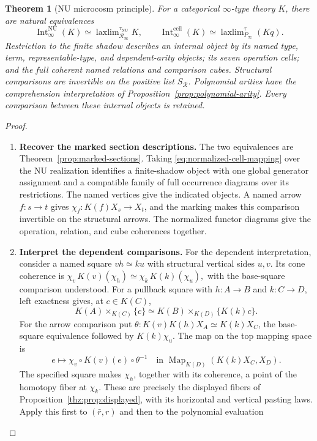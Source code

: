 \documentclass[oneside]{article}
\theoremstyle{plain}
\newtheorem{theorem}{Theorem}[section]
\theoremstyle{definition}
\theoremstyle{remark}
\newcommand{\Int}{\operatorname{Int}}
\newcommand{\Map}{\operatorname{Map}}
\newcommand{\NU}{\mathrm{NU}}
\newcommand{\RNU}{\mathcal R_{\infty}}
\newcommand{\laxlim}{\mathop{\mathrm{laxlim}}}
\begin{document}
\begin{theorem}[NU microcosm principle]\label{thm:nu-microcosm}
For a categorical $\infty$-type theory $K$, there are natural equivalences
\[
 \Int^{\NU}_\infty(K)\simeq\laxlim_{\RNU}^{\tau_{\NU}}K,
 \qquad
 \Int^{\mathrm{cell}}_\infty(K)\simeq\laxlim_{P_\infty}^{\tau}(Kq).
\]
Restriction to the finite shadow describes an internal object by its named
type, term, representable-type, and dependent-arity objects; its seven
operation cells; and the full coherent named relations and comparison
cubes. Structural comparisons are invertible on the positive list
$S_{\mathcal R}$. Polynomial arities have the comprehension interpretation
of Proposition~\ref{prop:polynomial-arity}. Every comparison between these
internal objects is retained.
\end{theorem}
\begin{proof}
\leavevmode
\begin{enumerate}
\item \textbf{Recover the marked section descriptions.} The two equivalences are Theorem~\ref{prop:marked-sections}. Taking
\eqref{eq:normalized-cell-mapping} over the NU realization identifies
a finite-shadow object with one global generator assignment and a
compatible family of full occurrence diagrams over its restrictions.
The named vertices give the indicated objects. A named arrow $f:s\to t$
gives $\chi_f:K(f)X_s\to X_t$, and the marking makes this comparison
invertible on the structural arrows. The normalized functor diagrams give
the operation, relation, and cube coherences together.
\item \textbf{Interpret the dependent comparisons.} For the dependent interpretation, consider a named square $vh\simeq ku$
with structural vertical sides $u,v$. Its cone coherence is $\chi_v\,K(v)(\chi_h) \simeq \chi_k\,K(k)(\chi_u),$ with the base-square comparison understood. For a pullback square with $h:A\to B$ and $k:C\to D$,
left exactness gives, at $c\in K(C)$,
\[
 K(A)\times_{K(C)}\{c\}\simeq K(B)\times_{K(D)}\{K(k)c\}.
\]
For the arrow comparison put
$\theta:K(v)K(h)X_A\simeq K(k)X_C$, the base-square equivalence
followed by $K(k)\chi_u$. The map on the top mapping space is
\[
 e\longmapsto\chi_v\circ K(v)(e)\circ\theta^{-1}
 \quad\text{in }\Map_{K(D)}(K(k)X_C,X_D).
\]
The specified square makes $\chi_h$, together with its coherence,
a point of the homotopy fiber at $\chi_k$. These are precisely the
displayed fibers of Proposition~\ref{thz:prop:displayed},
with its horizontal and vertical pasting laws.
Apply this first to $(\bar r,r)$ and then to the polynomial evaluation

\end{enumerate}
\end{proof}
\end{document}
